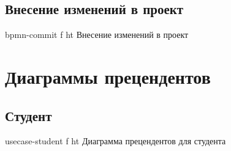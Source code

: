 \documentclass{bmstu}
\begin{document}
\subsection*{Внесение изменений в проект}
{bpmn-commit}
{f}
{ht}
{\textwidth}
{Внесение изменений в проект}
\FloatBarrier

\section{Диаграммы прецендентов}

\subsection*{Студент}
{usecase-student}
{f}
{ht}
{\textwidth}
{Диаграмма прецендентов для студента}
\FloatBarrier
\end{document}
